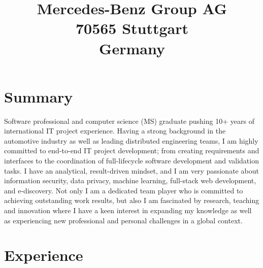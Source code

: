 \documentclass[11pt,a4paper,sans]{moderncv}
\title{\large Mercedes-Benz Group AG \\ 70565 Stuttgart \\ Germany}
\begin{document}
\makecvtitle

\section{Summary}
Software professional and computer science (MS) graduate pushing 10+ years of international IT
project experience. Having a strong background in the automotive industry as well as leading
distributed engineering teams, I am highly committed to end-to-end IT project development; \linebreak from
creating requirements and interfaces to the coordination of full-lifecycle software development and
validation tasks. I have an analytical, result-driven mindset, and I am very passionate about
information security, data privacy, machine learning, full-stack web development, and e-discovery. Not only I am a
dedicated team player who is committed to achieving outstanding work results, but also I am
fascinated by research, teaching and innovation where I have a keen interest in expanding my knowledge
as well as experiencing new professional and personal challenges in a global context.

\section{Experience}
\end{document}
